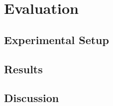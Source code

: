 \chapter{Evaluation}\label{ch:eval}
\section{Experimental Setup}
\section{Results}
\section{Discussion}